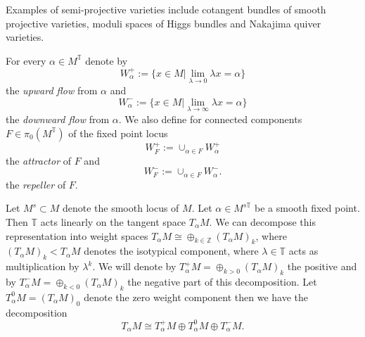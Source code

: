 \documentclass[12pt]{article}
\numberwithin{equation}{section}
\theoremstyle{remark}
\theoremstyle{definition}
\numberwithin{theorem}{section}
\newcommand{\T}{{\mathbb{T}}}
\def\Z{\mathbb{Z}}
\renewcommand{\1}{\mathbbm{1}}
\begin{document}
Examples of semi-projective varieties include  cotangent bundles of smooth projective varieties, moduli spaces of Higgs bundles and Nakajima quiver varieties.

For every $\alpha\in M^{\T}$ denote by  $$W^+_\alpha:= \{ x\in M | \lim_{\lambda\to 0}  \lambda x = \alpha\}$$ the {\em upward flow} from $\alpha$ and $$W^-_\alpha:= \{ x\in M | \lim_{\lambda\to \infty}  \lambda x = \alpha\}$$ the {\em downward flow} from $\alpha$. We also define for connected components $F\in \pi_0(M^{\T})$ of the fixed point locus $$W^+_F:=\cup_{\alpha\in F} W^+_\alpha$$ the {\em attractor} of $F$  
and $$W^-_F:=\cup_{\alpha\in F} W^-_\alpha.$$ the {\em repeller} of $F$. 

Let $M^s\subset M$ denote the smooth locus of $M$. Let $\alpha\in M^{s\T}$ be a smooth fixed point.  Then $\T$ acts linearly on the tangent space $T_\alpha M$. We can decompose this representation into weight spaces
$T_\alpha M\cong \oplus_{k\in \Z} (T_\alpha M)_k$, where $(T_\alpha M)_k<T_\alpha M$ denotes the isotypical component, where $\lambda\in \T$ acts as multiplication by $\lambda^k$. We will denote by $T^+_\alpha M = \oplus_{k>0}(T_\alpha M)_k$ the positive and by $T^-_\alpha M = \oplus_{k<0}(T_\alpha M)_k$ the negative part of this decomposition. Let  $T^0_\alpha M=(T_\alpha M)_0$ denote the zero weight component then we have the decomposition $$T_\alpha M \cong  T^+_\alpha M \oplus T^0_\alpha M \oplus T^-_\alpha M. $$
\end{document}
